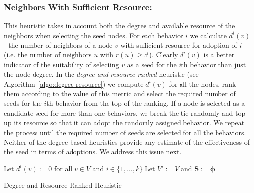 \documentclass[letterpaper]{article}
\theoremstyle{plain} 		\newtheorem{thm}{Theorem}[section]
\theoremstyle{definition} 	\newtheorem{defn}[thm]{Definition}
\theoremstyle{remark}		\newtheorem{rem}{Remark}
\begin{document}
\subsubsection{Neighbors With Sufficient Resource:} This heuristic takes in account both the degree and available resource of the neighbors when selecting the seed nodes. For each behavior $i$ we calculate $d^i(v)$ - the number of neighbors of a node $v$ with sufficient resource for adoption of $i$ (i.e. the number of neighbors $u$ with $r(u) \ge c^i$). Clearly $d^i(v)$ is a better indicator of the suitability of selecting $v$ as a seed for the $i$th behavior than just the node degree. In the \textit{degree and resource ranked} heuristic (see Algorithm~\ref{algo:degree-resource}) we compute $d^i(v)$ for all the nodes, rank them according to the value of this metric and select the required number of seeds for the $i$th behavior from the top of the ranking. If a node is selected as a candidate seed for more than one behaviors, we break the tie randomly and top up its resource so that it can adopt the randomly assigned behavior. We repeat the process until the required number of seeds are selected for all the behaviors.
Neither of the degree based heuristics provide any estimate of the effectiveness of the seed in terms of adoptions. We address this issue next. 



\begin{algorithm}[t]
\SetAlgoNoLine
{}
Let $d^i(v):=0$ for all $v\in V$ and $i \in \{1,\ldots,k\}$\;
Let $V':=V$ and $\mathbf{S:=}\boldsymbol{\phi}$\;
\caption{Degree and Resource Ranked Heuristic}
\label{algo:degree-resource}
\end{algorithm}
\end{document}
